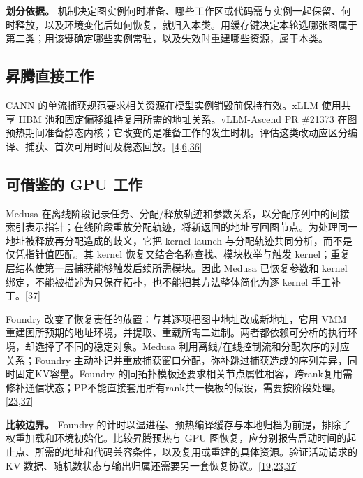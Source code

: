 \documentclass[
  UTF8,
  zihao=5]{ctexart}
\begin{document}
\textbf{划分依据。}
机制决定图实例何时准备、哪些工作区或代码需与实例一起保留、何时释放，以及环境变化后如何恢复，就归入本类。用缓存键决定本轮选哪张图属于第二类；用该键确定哪些实例常驻，以及失效时重建哪些资源，属于本类。

\hypertarget{ux6607ux817eux76f4ux63a5ux5de5ux4f5c-4}{%
\subsection{昇腾直接工作}\label{ux6607ux817eux76f4ux63a5ux5de5ux4f5c-4}}

CANN 的单流捕获规范要求相关资源在模型实例销毁前保持有效。xLLM 使用共享
HBM 池和固定偏移维持复用所需的地址关系。vLLM-Ascend
\href{https://github.com/vllm-project/vllm-ascend/pull/21373}{PR
\#21373}
在图预热期间准备静态内核；它改变的是准备工作的发生时机。评估这类改动应区分编译、捕获、首次可用时间及稳态回放。{[}\protect\hyperlink{ref-liu2025xllm}{4},\protect\hyperlink{ref-cann910single}{6},\protect\hyperlink{ref-ascend21373}{36}{]}

\hypertarget{ux53efux501fux9274ux7684-gpu-ux5de5ux4f5c-4}{%
\subsection{可借鉴的 GPU
工作}\label{ux53efux501fux9274ux7684-gpu-ux5de5ux4f5c-4}}

Medusa
在离线阶段记录任务、分配/释放轨迹和参数关系，以分配序列中的间接索引表示指针；在线阶段重放分配轨迹，将新返回的地址写回图节点。为处理同一地址被释放再分配造成的歧义，它把
kernel launch 与分配轨迹共同分析，而不是仅凭指针值匹配。其 kernel
恢复又结合名称查找、模块枚举与触发
kernel；重复层结构使第一层捕获能够触发后续所需模块。因此 Medusa
已恢复参数和 kernel
绑定，不能被描述为只保存拓扑，也不能把其方法整体简化为逐 kernel
手工补丁。{[}\protect\hyperlink{ref-zeng2025medusa}{37}{]}

Foundry 改变了恢复责任的放置：与其逐项把图中地址改成新地址，它用 VMM
重建图所预期的地址环境，并提取、重载所需二进制。两者都依赖可分析的执行环境，却选择了不同的稳定对象。Medusa
利用离线/在线控制流和分配次序的对应关系；Foundry
主动补记并重放捕获窗口分配，弥补跳过捕获造成的序列差异，同时固定KV容量。Foundry
的同拓扑模板还要求相关节点属性相容，跨rank复用需修补通信状态；PP不能直接套用所有rank共一模板的假设，需要按阶段处理。{[}\protect\hyperlink{ref-liu2026foundry}{23},\protect\hyperlink{ref-zeng2025medusa}{37}{]}

\textbf{比较边界。} Foundry
的计时以温进程、预热编译缓存与本地归档为前提，排除了权重加载和环境初始化。比较昇腾预热与
GPU
图恢复，应分别报告启动时间的起止点、所需的地址和代码兼容条件，以及复用或重建的具体资源。验证活动请求的
KV
数据、随机数状态与输出归属还需要另一套恢复协议。{[}\protect\hyperlink{ref-yu2026ascendfield}{19},\protect\hyperlink{ref-liu2026foundry}{23},\protect\hyperlink{ref-zeng2025medusa}{37}{]}
\end{document}
